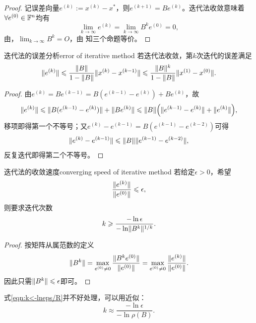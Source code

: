 \begin{proof}
    记误差向量$e^{(k)} := x^{(k)} - x^*$，则$e^{(k+1)} = Be^{(k)}$。迭代法收敛意味着$\forall e^{(0)} \in \mathbb{F}^n$均有
    \[
        \lim_{k\to\infty}e^{(k)} = \lim_{k\to\infty}B^ke^{(0)} = 0,
    \]
    由，$\textstyle \lim_{k\to\infty}B^k = O$，由 知三个命题等价。
\end{proof}

\begin{theorem}
    {迭代法的误差分析}{error of iterative method}
    若迭代法收敛，第$k$次迭代的误差满足
    \begin{equation}
        \lVert e^{(k)}\rVert \leqslant \frac{\lVert B\rVert}{1 - \lVert B\rVert}\lVert x^{(k)} - x^{(k-1)}\rVert \leqslant \frac{\lVert B\rVert^k}{1 - \lVert B\rVert}\lVert x^{(1)} - x^{(0)}\rVert.
    \end{equation}
\end{theorem}

\begin{proof}
    由$e^{(k)} = Be^{(k-1)} = B(e^{(k-1)} - e^{(k)}) + Be^{(k)}$，故
    \[
        \lVert e^{(k)}\rVert \leqslant \lVert B(e^{(k-1)} - e^{(k)})\rVert + \lVert Be^{(k)}\rVert \leqslant \lVert B\rVert\Bigl(\lVert e^{(k-1)} - e^{(k)}\rVert + \lVert e^{(k)}\rVert\Bigr),
    \]
    移项即得第一个不等号；又$e^{(k)} - e^{(k-1)} = B(e^{(k-1)} - e^{(k-2)})$可得
    \[
        \lVert e^{(k)} - e^{(k-1)}\rVert \leqslant \lVert B\rVert\lVert e^{(k-1)} - e^{(k-2)}\rVert,
    \]
    反复迭代即得第二个不等号。
\end{proof}

\begin{theorem}
    {迭代法的收敛速度}{converging speed of iterative method}
    若给定$\epsilon > 0$，希望
    \[
        \frac{\lVert e^{(k)}\rVert}{\lVert e^{(0)}\rVert} \leqslant \epsilon,
    \]
    则要求迭代次数
    \begin{equation}
        \label{eqn:k<-lneps/R}
        k \geqslant \frac{-\ln\epsilon}{-\ln\lVert B^k\rVert^{1/k}}.
    \end{equation}
\end{theorem}

\begin{proof}
    按矩阵从属范数的定义
    \[
        \lVert B^k\rVert = \max_{e^{(0)}\neq 0}\frac{\lVert B^ke^{(0)}\rVert}{\lVert e^{(0)}\rVert} = \max_{e^{(0)}\neq 0}\frac{\lVert e^{(k)}\rVert}{\lVert e^{(0)}\rVert}.
    \]
    因此只需$\lVert B^k\rVert \leqslant \epsilon$即可。
\end{proof}

\begin{remark}
    式\eqref{eqn:k<-lneps/R}并不好处理，可以用近似：
    \begin{equation}\label{eq:na-asymptotic-iteration-count}
        k \approx \frac{-\ln\epsilon}{-\ln\rho(B)}.
    \end{equation}
\end{remark}

